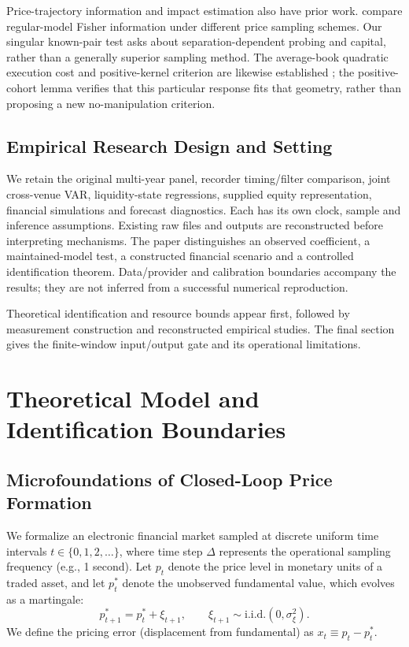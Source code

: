 \documentclass[12pt]{article}
\theoremstyle{definition}
\theoremstyle{remark}
\begin{document}
Price-trajectory information and impact estimation also have prior work. \citet{li2024trajectory} compare regular-model Fisher information under different price sampling schemes. Our singular known-pair test asks about separation-dependent probing and capital, rather than a generally superior sampling method. The average-book quadratic execution cost and positive-kernel criterion are likewise established \citep{alfonsi2016matrix}; the positive-cohort lemma verifies that this particular response fits that geometry, rather than proposing a new no-manipulation criterion.

\subsection{Empirical Research Design and Setting}
We retain the original multi-year panel, recorder timing/filter comparison, joint cross-venue VAR, liquidity-state regressions, supplied equity representation, financial simulations and forecast diagnostics. Each has its own clock, sample and inference assumptions. Existing raw files and outputs are reconstructed before interpreting mechanisms. The paper distinguishes an observed coefficient, a maintained-model test, a constructed financial scenario and a controlled identification theorem. Data/provider and calibration boundaries accompany the results; they are not inferred from a successful numerical reproduction.

Theoretical identification and resource bounds appear first, followed by measurement construction and reconstructed empirical studies. The final section gives the finite-window input/output gate and its operational limitations.


\section{Theoretical Model and Identification Boundaries}
\label{sec:model}

\subsection{Microfoundations of Closed-Loop Price Formation}
We formalize an electronic financial market sampled at discrete uniform time intervals $t \in \{0, 1, 2, \dots\}$, where time step $\Delta$ represents the operational sampling frequency (e.g., 1 second). Let $p_t$ denote the price level in monetary units of a traded asset, and let $p_t^*$ denote the unobserved fundamental value, which evolves as a martingale:
\begin{equation}
p_{t+1}^* = p_t^* + \xi_{t+1}, \qquad \xi_{t+1} \sim \text{i.i.d.}(0, \sigma_\xi^2).
\label{eq:fundamental_process}
\end{equation}
We define the pricing error (displacement from fundamental) as $x_t \equiv p_t - p_t^*$.
\end{document}
